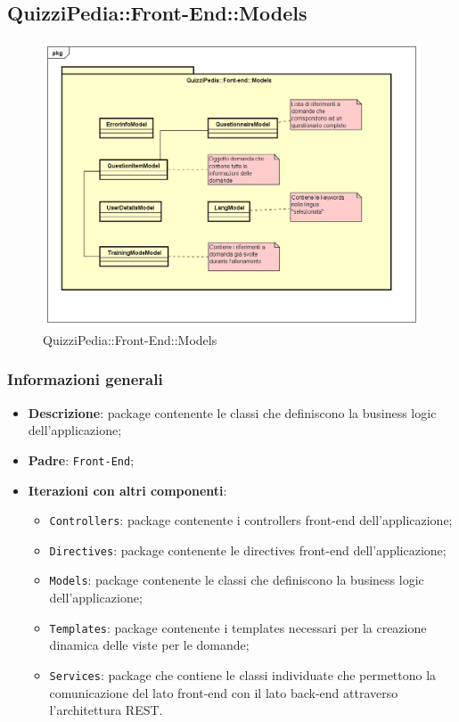 \newpage

\subsection{QuizziPedia::Front-End::Models}

	\label{QuizziPedia::Front-End::Models}
	
	\begin{figure}[h]
		\centering
		\includegraphics[scale=0.5,keepaspectratio]{UML/Package/QuizziPedia_Front-End_Models.png}
		\caption{QuizziPedia::Front-End::Models}
	\end{figure}

	\subsubsection{Informazioni generali}
		\begin{itemize}
			\item \textbf{Descrizione}: package contenente le classi che definiscono la business logic dell'applicazione;
			\item \textbf{Padre}: \texttt{Front-End};
			\item \textbf{Iterazioni con altri componenti}: 
				\begin{itemize}				
					\item \texttt{Controllers}: package contenente i controllers front-end dell'applicazione;
					\item \texttt{Directives}: package contenente le directives front-end dell'applicazione;
					\item \texttt{Models}: package contenente le classi che definiscono la business logic dell'applicazione;
					\item \texttt{Templates}: package contenente i templates necessari per la creazione dinamica delle viste per le domande;
					\item \texttt{Services}: package che contiene le classi individuate che permettono la comunicazione del lato front-end con il lato back-end attraverso l'architettura REST.
				\end{itemize}

		\end{itemize}
	

